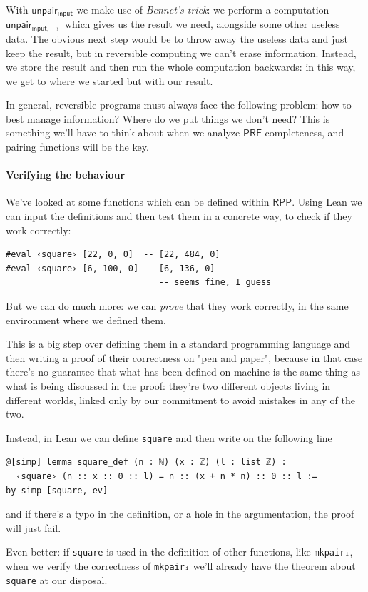 \documentclass{book}
\theoremstyle{definition}
\theoremstyle{remark}
\theoremstyle{plain}
\newcommand{\RPP}{\mathsf{RPP}}
\newcommand{\PRF}{\mathsf{PRF}}
\newcommand{\rppunpairi}{\mathsf{unpair_{input}}}
\newcommand{\rppunpairifwd}{\mathsf{unpair_{input, \rightarrow}}}
\begin{document}
With $\rppunpairi$ we make use of \textit{Bennet's trick}:
we perform a computation $\rppunpairifwd$ which gives us the result we need, alongside some other useless data.
The obvious next step would be to throw away the useless data and just keep the result,
but in reversible computing we can't erase information.
Instead, we store the result and then run the whole computation backwards:
in this way, we get to where we started but with our result.

In general, reversible programs must always face the following problem: how to best manage information?
Where do we put things we don't need?
This is something we'll have to think about when we analyze $\PRF$-completeness,
and pairing functions will be the key.

\paragraph*{Verifying the behaviour}

We've looked at some functions which can be defined within $\RPP$.
Using Lean we can input the definitions and then test them in a concrete way,
to check if they work correctly:
\begin{lstlisting}
#eval ‹square› [22, 0, 0]  -- [22, 484, 0]
#eval ‹square› [6, 100, 0] -- [6, 136, 0]
                              -- seems fine, I guess
\end{lstlisting}
But we can do much more: we can \textit{prove} that they work correctly,
in the same environment where we defined them.

This is a big step over defining them in a standard programming language and then
writing a proof of their correctness on "pen and paper",
because in that case there's no guarantee that what has been defined on machine
is the same thing as what is being discussed in the proof:
they're two different objects living in different worlds,
linked only by our commitment to avoid mistakes in any of the two.

Instead, in Lean we can define \lstinline{square} and then write on the following line
\begin{lstlisting}
@[simp] lemma square_def (n : ℕ) (x : ℤ) (l : list ℤ) :
  ‹square› (n :: x :: 0 :: l) = n :: (x + n * n) :: 0 :: l :=
by simp [square, ev]
\end{lstlisting}
and if there's a typo in the definition, or a hole in the argumentation,
the proof will just fail.

Even better: if \lstinline{square} is used in the definition of other functions,
like \lstinline{mkpairᵢ}, when we verify the correctness of \lstinline{mkpairᵢ}
we'll already have the theorem about \lstinline{square} at our disposal.
\end{document}
